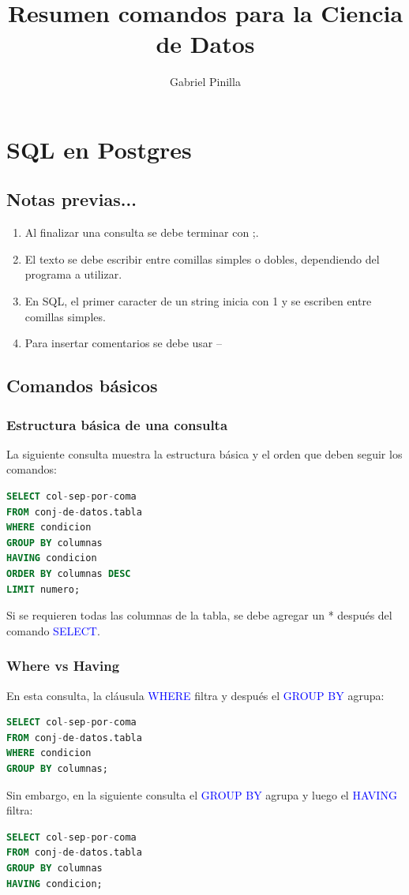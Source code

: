 \documentclass[a4paper, 12pt]{book}
\begin{document}
\author{Gabriel Pinilla}
\title{Resumen comandos para la Ciencia de Datos}

\frontmatter
\maketitle
\tableofcontents %
\mainmatter %
%
\chapter{SQL en Postgres}
\lstset{style=estilosql}
\section{Notas previas...}
\begin{enumerate}
	\item Al finalizar una consulta se debe terminar con ;.
	\item El texto se debe escribir entre comillas simples o dobles, dependiendo del programa a utilizar.
	\item En SQL, el primer caracter de un string inicia con 1 y se escriben entre comillas simples.
	\item Para insertar comentarios se debe usar --
\end{enumerate}
\section{Comandos básicos}
\subsection{Estructura básica de una consulta}
La siguiente consulta muestra la estructura básica y el orden que deben seguir los comandos:
\begin{lstlisting}[language=SQL]
SELECT col-sep-por-coma
FROM conj-de-datos.tabla
WHERE condicion
GROUP BY columnas
HAVING condicion
ORDER BY columnas DESC
LIMIT numero;
\end{lstlisting}
Si se requieren todas las columnas de la tabla, se debe agregar un * después del comando \textcolor{blue}{SELECT}.
\subsection{Where vs Having}
En esta consulta, la cláusula \textcolor{blue}{WHERE} filtra y después el \textcolor{blue}{GROUP BY} agrupa:
\begin{lstlisting}[language=SQL]
SELECT col-sep-por-coma
FROM conj-de-datos.tabla
WHERE condicion
GROUP BY columnas;
\end{lstlisting}
Sin embargo, en la siguiente consulta el \textcolor{blue}{GROUP BY} agrupa y luego el \textcolor{blue}{HAVING} filtra:
\begin{lstlisting}[language=SQL]
SELECT col-sep-por-coma
FROM conj-de-datos.tabla
GROUP BY columnas
HAVING condicion;
\end{lstlisting}
\end{document}
